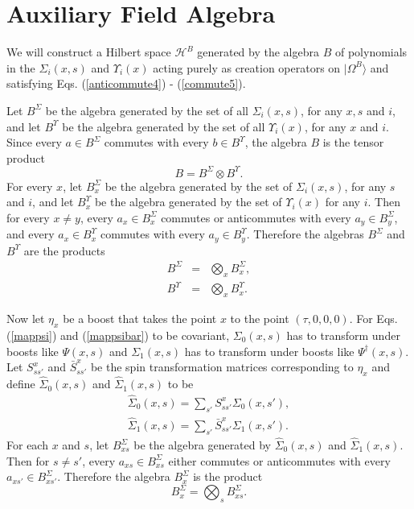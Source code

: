 \documentclass[twocolumn,amsmath,amssymb]{revtex4-1}
\begin{document}
\section{\label{app:auxalgebra} Auxiliary Field Algebra}

We will construct a
Hilbert space $\mathcal{H}^B$ generated by the algebra $B$
of polynomials in the $\Sigma_i( x, s)$ and $\Upsilon_i( x)$
acting purely as creation operators on $|\Omega^B \rangle $ and 
satisfying Eqs. (\ref{anticommute4}) - (\ref{commute5}).

Let $B^\Sigma$ be the algebra generated by the set of all $\Sigma_i( x, s)$, for any $x, s$ and $i$,
and let $B^\Upsilon$ be
the algebra generated by the set of all $\Upsilon_i(x)$, for any $x$ and $i$.
Since every $a \in B^\Sigma$ commutes with every $b \in B^\Upsilon$,
the algebra $B$ is the tensor product
\begin{equation}
  \label{basprod}
  B = B^\Sigma \otimes B^\Upsilon.
\end{equation}
For every $x$, let $B^\Sigma_x$ be
the algebra generated by the set of $\Sigma_i( x, s)$, for any $s$ and $i$,
and let $B^\Upsilon_x$ be
the algebra generated by the set of $\Upsilon_i( x)$ for any $i$.
Then for every $x \ne y$, every $a_x \in  B^\Sigma_x$
commutes or anticommutes with every $a_y \in  B^\Sigma_y$,
and every
$a_x \in  B^\Upsilon_x$
commutes with every $a_y \in  B^\Upsilon_y$.
Therefore the algebras $B^\Sigma$ and $B^\Upsilon$ are the products
\begin{subequations}
\begin{eqnarray}
  \label{bsprod}
    B^\Sigma  &=&  \bigotimes_x B^\Sigma_x, \\
  \label{buprod}
  B^\Upsilon  &=&  \bigotimes_x B^\Upsilon_x.
\end{eqnarray}
\end{subequations}

Now let $\eta_x$ be a boost that takes the point $x$ to the point $(\tau, 0, 0, 0)$.
For Eqs. (\ref{mappsi}) and (\ref{mappsibar}) to be covariant,
$\Sigma_0(x,s)$ has to transform under boosts like $\Psi( x, s)$ and 
$\Sigma_1(x,s)$ has to transform under boosts like $\Psi^\dagger( x, s)$.
Let $S^x_{ss'}$ and $\bar{S}^x_{ss'}$ be the spin transformation
matrices corresponding to $\eta_x$ and define $\hat{\Sigma}_0(x,s)$ and $\hat{\Sigma}_1(x,s)$ to be
\begin{subequations}
  \begin{eqnarray}
    \label{defhats0}
    \hat{\Sigma}_0(x,s) = \sum_{s'} S^x_{ss'} \Sigma_0( x, s'), \\
     \label{defhats1}
     \hat{\Sigma}_1(x,s) = \sum_{s'} \bar{S}^x_{ss'} \Sigma_1( x, s').
  \end{eqnarray}
\end{subequations}
For each $x$ and $s$, let $B^\Sigma_{xs}$ be the algebra generated by $\hat{\Sigma}_0(x,s)$
and $\hat{\Sigma}_1(x,s)$. Then for $s \ne s'$, every $a_{xs} \in B^\Sigma_{xs}$ either
commutes or anticommutes with every $a_{xs'} \in B^\Sigma_{xs'}$. Therefore the algebra
$B^\Sigma_x$ is the product
\begin{equation}
  \label{bxsprod}
    B^\Sigma_x  =  \bigotimes_s B^\Sigma_{xs}.
\end{equation}
\end{document}
